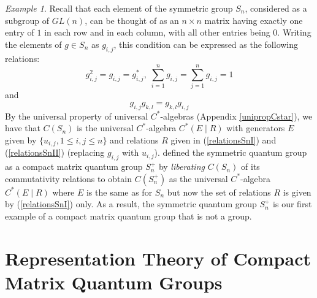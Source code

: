 \documentclass{article}
\theoremstyle{plain}
\theoremstyle{definition}
\theoremstyle{remark}
\newtheorem{example}[theorem]{Example}
\begin{document}
\begin{example} \label{exquantumgroups}
	Recall that each element of the symmetric group $S_n$, 
	considered as a subgroup of $GL(n)$,
	can be thought of as an $n \times n$ matrix
	having exactly one entry of $1$ 
	in each row and in each column, with all other entries being $0$.
	Writing the elements of $g \in S_n$ as $g_{i,j}$, this condition
	can be expressed as the following relations:
	\begin{equation} \label{relationsSnI}
		g_{i,j}^2 = g_{i,j} = g_{i,j}^*, \;
		\sum_{i=1}^{n} g_{i,j} = \sum_{j=1}^{n} g_{i,j} = 1
	\end{equation}
	and
	\begin{equation} \label{relationsSnII}
		g_{i,j}g_{k,l} = g_{k,l}g_{i,j}
	\end{equation}
	By the universal property of universal $C^*$-algebras 
	(Appendix \ref{unipropCstar}),
	we have that $C(S_n)$ is the universal $C^*$-algebra
	$C^*(E \mid R)$
	with generators $E$ given by $\{u_{i,j}, 1 \leq i,j \leq n\}$
	and relations $R$ given in (\ref{relationsSnI}) and (\ref{relationsSnII}) (replacing $g_{i,j}$ with $u_{i,j}$).
	\citet{wang1998} 
	defined the symmetric quantum group 
	as a compact matrix quantum group $S_n^+$ by \textit{liberating} $C(S_n)$
	of its commutativity relations to obtain $C(S_n^+)$
	as the universal $C^*$-algebra
	$C^*(E \mid R)$ where $E$ is the same as for $S_n$ but now the set of 
	relations $R$ is given by (\ref{relationsSnI}) only.
	As a result, the symmetric quantum group $S_n^+$ is
	our first example of a compact matrix quantum group 
	that is not a group. 
\end{example}


\section{Representation Theory of Compact Matrix Quantum Groups}
\end{document}
